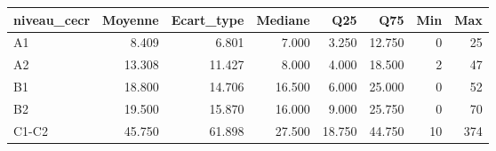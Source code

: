 \begin{tabular}{lrrrrrrr}
\toprule
niveau\_cecr & Moyenne & Ecart\_type & Mediane & Q25 & Q75 & Min & Max \\
\midrule
A1 & 8.409 & 6.801 & 7.000 & 3.250 & 12.750 & 0 & 25 \\
A2 & 13.308 & 11.427 & 8.000 & 4.000 & 18.500 & 2 & 47 \\
B1 & 18.800 & 14.706 & 16.500 & 6.000 & 25.000 & 0 & 52 \\
B2 & 19.500 & 15.870 & 16.000 & 9.000 & 25.750 & 0 & 70 \\
C1-C2 & 45.750 & 61.898 & 27.500 & 18.750 & 44.750 & 10 & 374 \\
\bottomrule
\end{tabular}
